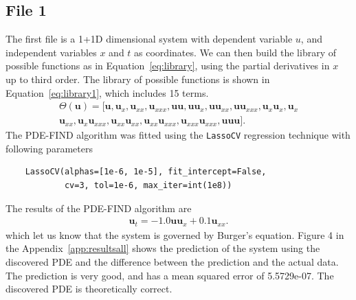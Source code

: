 \documentclass[unicode,11pt,a4paper,oneside,numbers=endperiod,openany]{scrartcl}
\begin{document}
\subsection*{File 1}
The first file is a 1+1D dimensional system with dependent variable $u$, and
independent variables $x$ and $t$ as coordinates.
We can then build the library of possible functions as in
Equation~\eqref{eq:library}, using the partial derivatives in $x$ up to
third order.
The library of possible functions is shown in Equation~\eqref{eq:library1},
which includes 15 terms.
\begin{align}\label{eq:library1}
    \Theta(\mathbf{u}) = [ \mathbf{u}, \mathbf{u}_x, \mathbf{u}_{xx}, \mathbf{u}_{xxx}, \mathbf{u}\mathbf{u}, \mathbf{u} \mathbf{u}_x, \mathbf{u} \mathbf{u}_{xx}, \mathbf{u} \mathbf{u}_{xxx}, \mathbf{u}_x \mathbf{u}_x, \mathbf{u}_x \\
    \mathbf{u}_{xx}, \mathbf{u}_x \mathbf{u}_{xxx}, \mathbf{u}_{xx} \mathbf{u}_{xx}, \mathbf{u}_{xx} \mathbf{u}_{xxx}, \mathbf{u}_{xxx} \mathbf{u}_{xxx}, \mathbf{u}\mathbf{u}\mathbf{u} ]. \nonumber
\end{align}
The PDE-FIND algorithm was fitted using the \texttt{LassoCV} regression
technique with following parameters
\begin{verbatim}
    LassoCV(alphas=[1e-6, 1e-5], fit_intercept=False,
            cv=3, tol=1e-6, max_iter=int(1e8))
\end{verbatim}
The results of the PDE-FIND algorithm are
\begin{align}
    \mathbf{u}_t = -1.0 \mathbf{u} \mathbf{u}_x + 0.1 \mathbf{u}_{xx}.
\end{align}
which let us know that the system is governed by Burger's equation.
Figure 4 in the Appendix~\ref{app:resultsall}
shows the prediction of the system using the
discovered PDE and the difference between the prediction and the actual data.
The prediction is very good, and has a
mean squared error of 5.5729e-07. The discovered PDE is theoretically correct.
\end{document}
